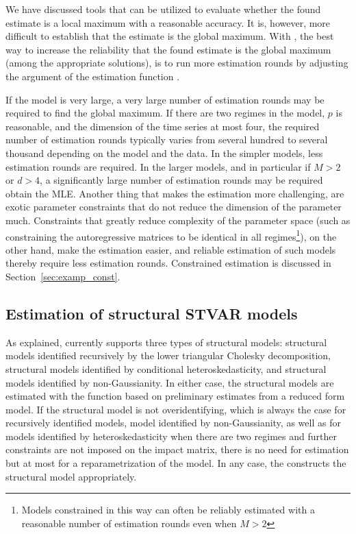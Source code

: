 \documentclass[nojss]{jss}
\begin{document}
We have discussed tools that can be utilized to evaluate whether the found estimate is a local maximum with a reasonable accuracy. It is, however, more difficult to establish that the estimate is the global maximum. With , the best way to increase the reliability that the found estimate is the global maximum (among the appropriate solutions), is to run more estimation rounds by adjusting the argument  of the estimation function .

If the model is very large, a very large number of estimation rounds may be required to find the global maximum. If there are two regimes in the model, $p$ is reasonable, and the dimension of the time series at most four, the required number of estimation rounds typically varies from several hundred to several thousand depending on the model and the data. In the simpler models, less estimation rounds are required. In the larger models, and in particular if $M>2$ or $d>4$, a significantly large number of estimation rounds may be required obtain the MLE. Another thing that makes the estimation more challenging, are exotic parameter constraints that do not reduce the dimension of the parameter much. Constraints that greatly reduce complexity of the parameter space (such as constraining the autoregressive matrices to be identical in all regimes\footnote{Models constrained in this way can often be reliably estimated with a reasonable number of estimation rounds even when $M>2$}), on the other hand, make the estimation easier, and reliable estimation of such models thereby require less estimation rounds. Constrained estimation is discussed in Section~\ref{sec:examp_const}.

\subsection{Estimation of structural STVAR models}\label{sec:estim_structural}
As explained,  currently supports three types of structural models: structural models identified recursively by the lower triangular Cholesky decomposition, structural models identified by conditional heteroskedasticity, and structural models identified by non-Gaussianity. In either case, the structural models are estimated with the function  based on preliminary estimates from a reduced form model. If the structural model is not overidentifying, which is always the case for recursively identified models, model identified by non-Gaussianity, as well as for models identified by heteroskedasticity when there are two regimes and further constraints are not imposed on the impact matrix, there is no need for estimation but at most for a reparametrization of the model. In any case, the  constructs the structural model appropriately.
\end{document}
